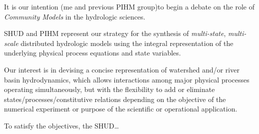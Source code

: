 \documentclass[
]{scrbook}
\begin{document}
It is our intention (me and previous PIHM group)to begin a debate on the role of \emph{Community Models} in the hydrologic sciences.

SHUD and PIHM represent our strategy for the synthesis of \emph{multi-state}, \emph{multi-scale} distributed hydrologic models using the integral representation of the underlying physical process equations and state variables.

Our interest is in devising a concise representation of watershed and/or river basin hydrodynamics, which allows interactions among major physical processes operating simultaneously, but with the flexibility to add or eliminate states/processes/constitutive relations depending on the objective of the numerical experiment or purpose of the scientific or operational application.

To satisfy the objectives, the SHUD\ldots{}
\end{document}
